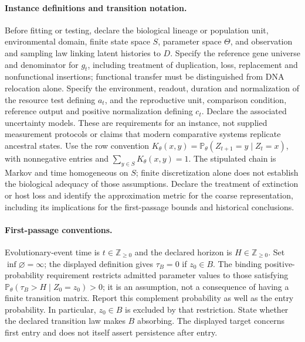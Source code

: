\documentclass[11pt]{article}
\begin{document}
\paragraph{Instance definitions and transition notation.} Before fitting or testing, declare the biological lineage or population unit, environmental domain, finite state space $S$, parameter space $\Theta$, and observation and sampling law linking latent histories to $D$. Specify the reference gene universe and denominator for $g_t$, including treatment of duplication, loss, replacement and nonfunctional insertions; functional transfer must be distinguished from DNA relocation alone. Specify the environment, readout, duration and normalization of the resource test defining $a_t$, and the reproductive unit, comparison condition, reference output and positive normalization defining $c_t$. Declare the associated uncertainty models. These are requirements for an instance, not supplied measurement protocols or claims that modern comparative systems replicate ancestral states. Use the row convention $K_\theta(x,y)=\mathbb{P}_\theta(Z_{t+1}=y\mid Z_t=x)$, with nonnegative entries and $\sum_{y\in S}K_\theta(x,y)=1$. The stipulated chain is Markov and time homogeneous on $S$; finite discretization alone does not establish the biological adequacy of those assumptions. Declare the treatment of extinction or host loss and identify the approximation metric for the coarse representation, including its implications for the first-passage bounds and historical conclusions.

\paragraph{First-passage conventions.} Evolutionary-event time is $t\in\mathbb{Z}_{\geq0}$ and the declared horizon is $H\in\mathbb{Z}_{\geq0}$. Set $\inf\varnothing=\infty$; the displayed definition gives $\tau_B=0$ if $z_0\in B$. The binding positive-probability requirement restricts admitted parameter values to those satisfying $\mathbb{P}_\theta(\tau_B>H\mid Z_0=z_0)>0$; it is an assumption, not a consequence of having a finite transition matrix. Report this complement probability as well as the entry probability. In particular, $z_0\in B$ is excluded by that restriction. State whether the declared transition law makes $B$ absorbing. The displayed target concerns first entry and does not itself assert persistence after entry.
\end{document}
